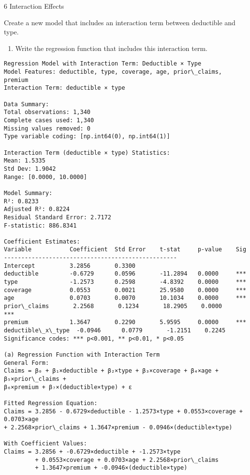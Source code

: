 \documentclass[8pt, twocolumn]{extarticle}
\providecommand{\tightlist}{%
      \setlength{\itemsep}{0pt}\setlength{\parskip}{0pt}}
\begin{document}
    6 Interaction Effects

Create a new model that includes an interaction term between deductible
and type.

    \begin{enumerate}
\def\labelenumi{(\alph{enumi})}
\tightlist
\item
  Write the regression function that includes this interaction term.
\end{enumerate}

    \begin{Verbatim}[commandchars=\\\{\}]
Regression Model with Interaction Term: Deductible × Type
Model Features: deductible, type, coverage, age, prior\_claims, premium
Interaction Term: deductible × type

Data Summary:
Total observations: 1,340
Complete cases used: 1,340
Missing values removed: 0
Type variable coding: [np.int64(0), np.int64(1)]

Interaction Term (deductible × type) Statistics:
Mean: 1.5335
Std Dev: 1.9042
Range: [0.0000, 10.0000]

Model Summary:
R²: 0.8233
Adjusted R²: 0.8224
Residual Standard Error: 2.7172
F-statistic: 886.8341

Coefficient Estimates:
Variable           Coefficient  Std Error    t-stat     p-value    Sig
--------------------------------------------------
Intercept          3.2856       0.3300
deductible         -0.6729      0.0596       -11.2894   0.0000     ***
type               -1.2573      0.2598       -4.8392    0.0000     ***
coverage           0.0553       0.0021       25.9580    0.0000     ***
age                0.0703       0.0070       10.1034    0.0000     ***
prior\_claims       2.2568       0.1234       18.2905    0.0000     ***
premium            1.3647       0.2290       5.9595     0.0000     ***
deductible\_x\_type  -0.0946      0.0779       -1.2151    0.2245
Significance codes: *** p<0.001, ** p<0.01, * p<0.05

(a) Regression Function with Interaction Term
General Form:
Claims = β₀ + β₁×deductible + β₂×type + β₃×coverage + β₄×age + β₅×prior\_claims +
β₆×premium + β₇×(deductible×type) + ε

Fitted Regression Equation:
Claims = 3.2856 - 0.6729×deductible - 1.2573×type + 0.0553×coverage + 0.0703×age
+ 2.2568×prior\_claims + 1.3647×premium - 0.0946×(deductible×type)

With Coefficient Values:
Claims = 3.2856 + -0.6729×deductible + -1.2573×type
         + 0.0553×coverage + 0.0703×age + 2.2568×prior\_claims
         + 1.3647×premium + -0.0946×(deductible×type)
    \end{Verbatim}
\end{document}
